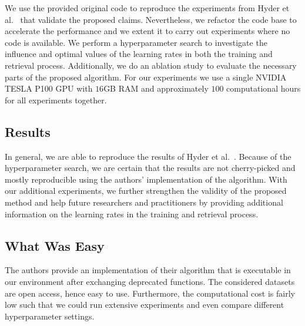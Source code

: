 We use the provided original code to reproduce the experiments from Hyder et al.~\cite{hyder2020solving} that validate the proposed claims. Nevertheless, we refactor the code base to accelerate the performance and we extent it to carry out experiments where no code is available. We perform a hyperparameter search to investigate the influence and optimal values of the learning rates in both the training and retrieval process. Additionally, we do an ablation study to evaluate the necessary parts of the proposed algorithm. For our experiments we use a single NVIDIA TESLA P100 GPU with $16$GB RAM and approximately $100$ computational hours for all experiments together.

\subsection*{Results}


In general, we are able to reproduce the results of Hyder et al.~\cite{hyder2020solving}. Because of the hyperparameter search, we are certain that the results are not cherry-picked and mostly reproducible using the authors' implementation of the algorithm. With our additional experiments, we further strengthen the validity of the proposed method and help future researchers and practitioners by providing additional information on the learning rates in the training and retrieval process.


\subsection*{What Was Easy}


The authors provide an implementation of their
algorithm that is executable in our environment after exchanging
deprecated functions. The considered datasets are open access, hence
easy to use. Furthermore, the computational cost is fairly low such
that we could run extensive experiments and even compare different hyperparameter settings.

